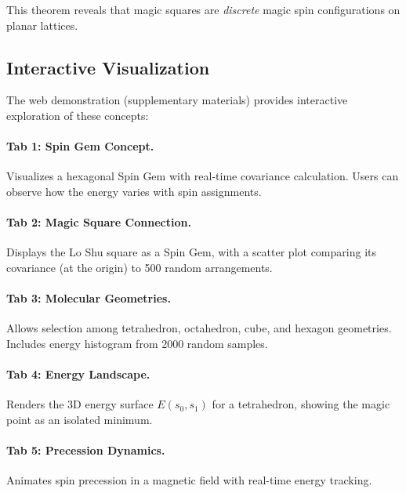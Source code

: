 This theorem reveals that magic squares are \emph{discrete} magic spin configurations on planar lattices.

\subsection{Interactive Visualization}
\label{sec:demo}

The web demonstration (supplementary materials) provides interactive exploration of these concepts:

\paragraph{Tab 1: Spin Gem Concept.} Visualizes a hexagonal Spin Gem with real-time covariance calculation. Users can observe how the energy varies with spin assignments.

\paragraph{Tab 2: Magic Square Connection.} Displays the Lo Shu square as a Spin Gem, with a scatter plot comparing its covariance (at the origin) to 500 random arrangements.

\paragraph{Tab 3: Molecular Geometries.} Allows selection among tetrahedron, octahedron, cube, and hexagon geometries. Includes energy histogram from 2000 random samples.

\paragraph{Tab 4: Energy Landscape.} Renders the 3D energy surface $E(s_0, s_1)$ for a tetrahedron, showing the magic point as an isolated minimum.

\paragraph{Tab 5: Precession Dynamics.} Animates spin precession in a magnetic field with real-time energy tracking.
